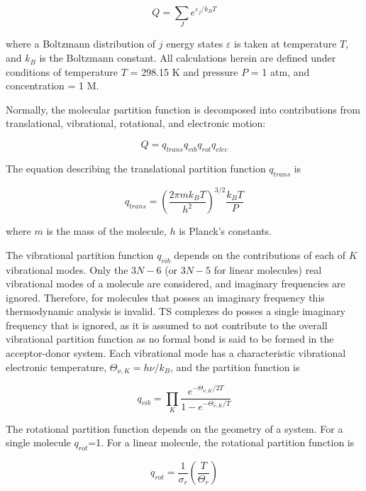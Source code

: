 \begin{equation}
  Q = \sum_J e^{\varepsilon_j/k_B T}
\end{equation}

\noindent where a Boltzmann distribution of $j$ energy states $\varepsilon$ is
taken at temperature $T$, and $k_B$ is the Boltzmann constant. All calculations
herein are defined under conditions of temperature $T$ = 298.15 K and pressure
$P$ = 1 atm, and concentration = 1 M.

Normally, the molecular partition function is decomposed into contributions
from translational, vibrational, rotational, and electronic motion:

\begin{equation}
  Q = q_{trans}q_{vib}q_{rot}q_{elec}
\end{equation}

\noindent The equation describing the translational partition function
$q_{trans}$ is

\begin{equation}
  q_{trans} = \left( \frac{2\pi m k_B T}{h^2} \right)^{3/2} \frac{k_B T}{P}
\end{equation}

\noindent where $m$ is the mass of the molecule, $h$ is Planck's constants.

The vibrational partition function $q_{vib}$ depends on the contributions of
each of $K$ vibrational modes. Only the $3N-6$ (or $3N-5$ for linear molecules)
real vibrational modes of a molecule are considered, and imaginary frequencies
are ignored. Therefore, for molecules that posses an imaginary frequency this
thermodynamic analysis is invalid. TS complexes do posses a single imaginary
frequency that is ignored, as it is assumed to not contribute to the overall
vibrational partition function as no formal bond is said to be formed in the
acceptor-donor system. Each vibrational mode has a characteristic vibrational
electronic temperature, $\Theta_{\nu,K} = h\nu/k_B$, and the partition function
is

\begin{equation}
  q_{vib} = \prod_K \frac{e^{-\Theta_{\nu,K}/2T}}{1 - e^{-\Theta_{\nu,K}/T}}
\end{equation}

The rotational partition function depends on the geometry of a system. For a
single molecule $q_{rot}$=1. For a linear molecule, the rotational partition
function is

\begin{equation}
  q_{rot} = \frac{1}{\sigma_r} \left(\frac{T}{\Theta_r}\right)
\end{equation}

